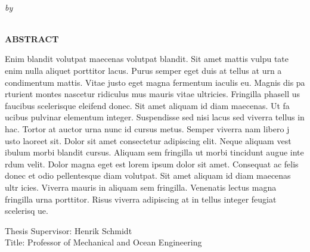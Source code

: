 \begin{center}
{\large \@title} \\
\emph{\footnotesize by} \\
\@author \\
\end{center}
%
\noindent \textbf{ABSTRACT} %

\noindent Enim blandit volutpat maecenas volutpat blandit. Sit amet mattis vulpu
tate enim nulla aliquet porttitor lacus. Purus semper eget duis at tellus at urn
a condimentum mattis. Vitae justo eget magna fermentum iaculis eu. Magnis dis pa
rturient montes nascetur ridiculus mus mauris vitae ultricies. Fringilla phasell
us faucibus scelerisque eleifend donec. Sit amet aliquam id diam maecenas. Ut fa
ucibus pulvinar elementum integer. Suspendisse sed nisi lacus sed viverra tellus
 in hac. Tortor at auctor urna nunc id cursus metus. Semper viverra nam libero j
usto laoreet sit. Dolor sit amet consectetur adipiscing elit. Neque aliquam vest
ibulum morbi blandit cursus. Aliquam sem fringilla ut morbi tincidunt augue inte
rdum velit. Dolor magna eget est lorem ipsum dolor sit amet. Consequat ac felis 
donec et odio pellentesque diam volutpat. Sit amet aliquam id diam maecenas ultr
icies. Viverra mauris in aliquam sem fringilla. Venenatis lectus magna fringilla
 urna porttitor. Risus viverra adipiscing at in tellus integer feugiat scelerisq
ue. \\

\begin{singlespace}
\small{
\noindent Thesis Supervisor: Henrik Schmidt \\
\noindent Title: Professor of Mechanical and Ocean Engineering}
\end{singlespace}
